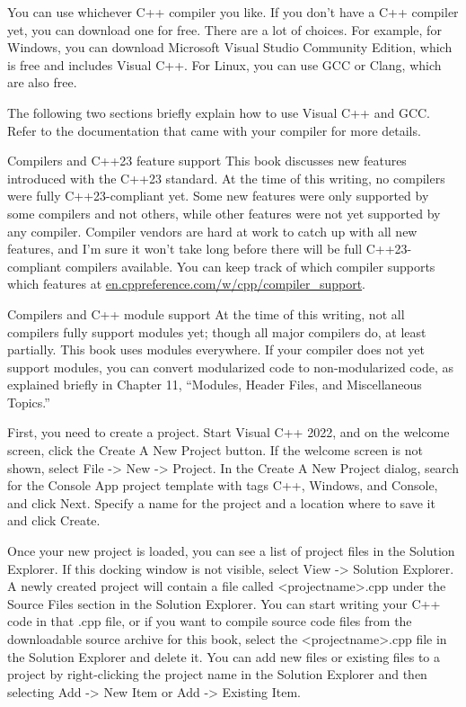 
You can use whichever C++ compiler you like. If you don’t have a C++ compiler yet, you can download one for free. There are a lot of choices. For example, for Windows, you can download Microsoft Visual Studio Community Edition, which is free and includes Visual C++. For Linux, you can use GCC or Clang, which are also free.

The following two sections briefly explain how to use Visual C++ and GCC. Refer to the documentation that came with your compiler for more details.

\begin{myTip}{Compilers and C++23 feature support}
This book discusses new features introduced with the C++23 standard. At the time of this writing, no compilers were fully C++23-compliant yet. Some new features were only supported by some compilers and not others, while other features were not yet supported by any compiler. Compiler vendors are hard at work to catch up with all new features, and I’m sure it won’t take long before there will be full C++23-compliant compilers available. You can keep track of which compiler supports which features at \url{en.cppreference.com/w/cpp/compiler_support}.
\end{myTip}

\begin{myTip}{Compilers and C++ module support}
At the time of this writing, not all compilers fully support modules yet; though all major compilers do, at least partially. This book uses modules everywhere. If your compiler does not yet support modules, you can convert modularized code to non-modularized code, as explained briefly in Chapter 11, “Modules, Header Files, and Miscellaneous Topics.”
\end{myTip}


First, you need to create a project. Start Visual C++ 2022, and on the welcome screen, click the Create A New Project button. If the welcome screen is not shown, select File -> New -> Project. In the Create A New Project dialog, search for the Console App project template with tags C++, Windows, and Console, and click Next. Specify a name for the project and a location where to save it and click Create.

Once your new project is loaded, you can see a list of project files in the Solution Explorer. If this docking window is not visible, select View -> Solution Explorer. A newly created project will contain a file called <projectname>.cpp under the Source Files section in the Solution Explorer. You can start writing your C++ code in that .cpp file, or if you want to compile source code files from the downloadable source archive for this book, select the <projectname>.cpp file in the Solution Explorer and delete it. You can add new files or existing files to a project by right-clicking the project name in the Solution Explorer and then selecting Add -> New Item or Add -> Existing Item.

